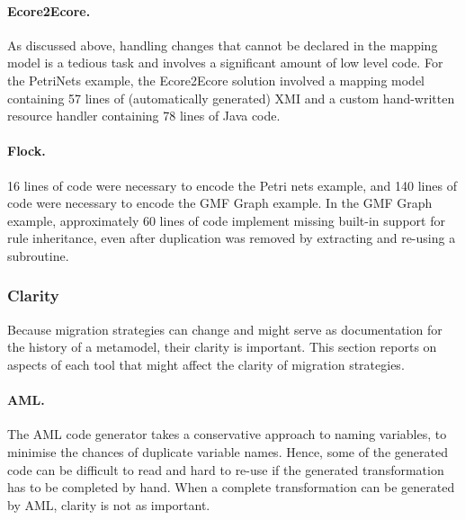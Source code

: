 \paragraph{Ecore2Ecore.} As discussed above, handling changes that cannot be declared in the mapping model is a tedious task and involves a significant amount of low level code. For the PetriNets example, the Ecore2Ecore solution involved a mapping model containing 57 lines of (automatically generated) XMI and a custom hand-written resource handler containing 78 lines of Java code. 

\paragraph{Flock.} 16 lines of code were necessary to encode the Petri nets example, and 140 lines of code were necessary to encode the GMF Graph example.
In the GMF Graph example, approximately 60 lines of code implement missing built-in support for rule inheritance, even after duplication was removed by extracting and re-using a subroutine.



\subsubsection{Clarity}
Because migration strategies can change and might serve as documentation for the history of a metamodel, their clarity is important. This section reports on aspects of each tool that might affect the clarity of migration strategies.

\paragraph{AML.} The AML code generator takes a conservative approach to naming variables, to minimise the chances of duplicate variable names. Hence, some of the generated code can be difficult to read and hard to re-use if the generated transformation has to be completed by hand. When a complete transformation can be generated by AML, clarity is not as important.

